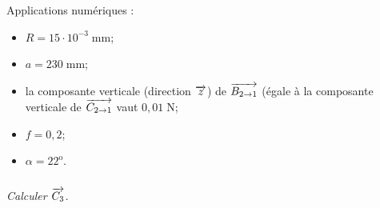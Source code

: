 \documentclass[10pt]{article}
\begin{document}
Applications numériques : 
\begin{itemize}
\item $R = 15\cdot 10^{-3} \; \text{mm}$;
\item $a = 230 \; \text{mm}$;
\item la composante verticale (direction $\overrightarrow{z}$) de $\overrightarrow{B_{2\rightarrow 1}}$ (égale à la composante verticale de $\overrightarrow{C_{2\rightarrow 1}}$ vaut $0,01 \; \text{N}$;
\item $f=0,2$;
\item $\alpha = 22^{\text{o}}$.
\end{itemize}

\subparagraph{}
\textit{Calculer  $\overrightarrow{C_3}$.}
\end{document}
